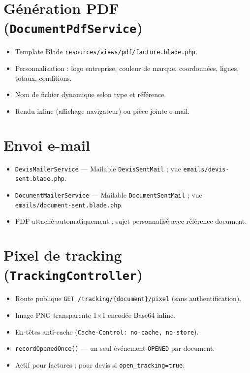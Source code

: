 \documentclass[11pt,a4paper]{report}
\newcommand{\route}[1]{\texttt{\small #1}}
\newcommand{\ctrl}[1]{\texttt{\small #1}}
\newcommand{\svc}[1]{\texttt{\small #1}}
\begin{document}
\section{Génération PDF (\svc{DocumentPdfService})}

\begin{itemize}[leftmargin=*]
    \item Template Blade \texttt{resources/views/pdf/facture.blade.php}.
    \item Personnalisation : logo entreprise, couleur de marque, coordonnées, lignes, totaux, conditions.
    \item Nom de fichier dynamique selon type et référence.
    \item Rendu inline (affichage navigateur) ou pièce jointe e-mail.
\end{itemize}

\section{Envoi e-mail}

\begin{itemize}[leftmargin=*]
    \item \svc{DevisMailerService} — Mailable \texttt{DevisSentMail} ; vue \texttt{emails/devis-sent.blade.php}.
    \item \svc{DocumentMailerService} — Mailable \texttt{DocumentSentMail} ; vue \texttt{emails/document-sent.blade.php}.
    \item PDF attaché automatiquement ; sujet personnalisé avec référence document.
\end{itemize}

\section{Pixel de tracking (\ctrl{TrackingController})}

\begin{itemize}[leftmargin=*]
    \item Route publique \route{GET /tracking/\{document\}/pixel} (sans authentification).
    \item Image PNG transparente 1$\times$1 encodée Base64 inline.
    \item En-têtes anti-cache (\texttt{Cache-Control: no-cache, no-store}).
    \item \texttt{recordOpenedOnce()} — un seul événement \texttt{OPENED} par document.
    \item Actif pour factures ; pour devis si \texttt{open\_tracking=true}.
\end{itemize}
\end{document}
